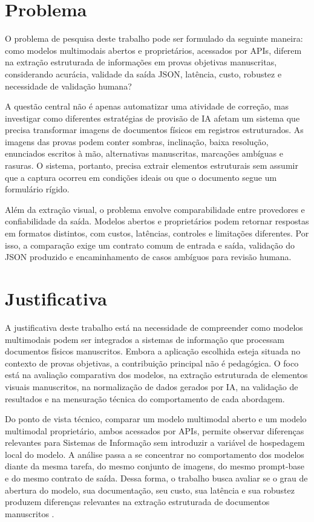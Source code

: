 \section{Problema}\label{problema}

O problema de pesquisa deste trabalho pode ser formulado da seguinte maneira: como modelos multimodais abertos e proprietários, acessados por APIs, diferem na extração estruturada de informações em provas objetivas manuscritas, considerando acurácia, validade da saída JSON, latência, custo, robustez e necessidade de validação humana?

A questão central não é apenas automatizar uma atividade de correção, mas investigar como diferentes estratégias de provisão de IA afetam um sistema que precisa transformar imagens de documentos físicos em registros estruturados. As imagens das provas podem conter sombras, inclinação, baixa resolução, enunciados escritos à mão, alternativas manuscritas, marcações ambíguas e rasuras. O sistema, portanto, precisa extrair elementos estruturais sem assumir que a captura ocorreu em condições ideais ou que o documento segue um formulário rígido.

Além da extração visual, o problema envolve comparabilidade entre provedores e confiabilidade da saída. Modelos abertos e proprietários podem retornar respostas em formatos distintos, com custos, latências, controles e limitações diferentes. Por isso, a comparação exige um contrato comum de entrada e saída, validação do JSON produzido e encaminhamento de casos ambíguos para revisão humana.

\section{Justificativa}\label{justificativa}

A justificativa deste trabalho está na necessidade de compreender como modelos multimodais podem ser integrados a sistemas de informação que processam documentos físicos manuscritos. Embora a aplicação escolhida esteja situada no contexto de provas objetivas, a contribuição principal não é pedagógica. O foco está na avaliação comparativa dos modelos, na extração estruturada de elementos visuais manuscritos, na normalização de dados gerados por IA, na validação de resultados e na mensuração técnica do comportamento de cada abordagem.

Do ponto de vista técnico, comparar um modelo multimodal aberto e um modelo multimodal proprietário, ambos acessados por APIs, permite observar diferenças relevantes para Sistemas de Informação sem introduzir a variável de hospedagem local do modelo. A análise passa a se concentrar no comportamento dos modelos diante da mesma tarefa, do mesmo conjunto de imagens, do mesmo prompt-base e do mesmo contrato de saída. Dessa forma, o trabalho busca avaliar se o grau de abertura do modelo, sua documentação, seu custo, sua latência e sua robustez produzem diferenças relevantes na extração estruturada de documentos manuscritos \cite{solaiman2023gradient,bommasani2023transparency,ntia2024openweights}.


